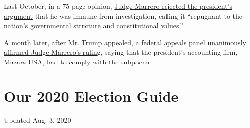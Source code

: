 Last October, in a 75-page opinion,
\href{https://www.nytimes3xbfgragh.onion/2019/10/07/nyregion/trump-taxes-lawsuit-vance.html}{Judge
Marrero rejected the president's argument} that he was immune from
investigation, calling it ``repugnant to the nation's governmental
structure and constitutional values.''

A month later, after Mr. Trump appealed,
\href{https://www.nytimes3xbfgragh.onion/2019/11/04/nyregion/trump-taxes-vance-appeal.html}{a
federal appeals panel unanimously affirmed Judge Marrero's rulin}g,
saying that the president's accounting firm, Mazars USA, had to comply
with the subpoena.

\hypertarget{our-2020-election-guide}{%
\section{Our 2020 Election Guide}\label{our-2020-election-guide}}

Updated Aug. 3, 2020

